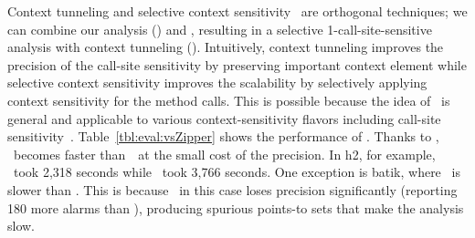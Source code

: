 %
%





Context tunneling and selective context sensitivity~\cite{Oh2014,JeJeChOh17} are orthogonal techniques; we can combine 
our analysis (\ours) and \Zipper, resulting in a selective 1-call-site-sensitive analysis with context tunneling (\oursZipper). 
Intuitively, context tunneling improves the precision of the call-site sensitivity by preserving important context element while selective context sensitivity improves the scalability by selectively applying context sensitivity for the method calls.
This is possible because the idea of \Zipper~is general and applicable to various context-sensitivity flavors including call-site sensitivity~\cite{ZipperJournal20}. 
Table~\ref{tbl:eval:vsZipper} shows the performance of \oursZipper. Thanks to \Zipper, \oursZipper~becomes faster than~\ours~at the small cost of the precision.
In h2, for example, \oursZipper~took 2,318 seconds while \ours~took 3,766 seconds.
One exception is batik, where \oursZipper~is slower than \ours. This is because 
\oursZipper~in this case loses precision significantly (reporting 180 more alarms than \ours), producing spurious points-to sets that make the analysis slow. 





